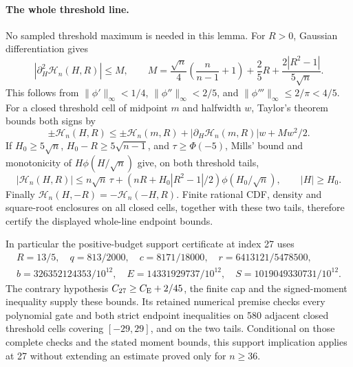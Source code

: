 \paragraph*{The whole threshold line.}
No sampled threshold maximum is needed in this lemma.
For \(R>0\), Gaussian differentiation gives
\[
 |\partial_H^2\mathcal H_n(H,R)|\le M,\qquad
 M=\frac{\sqrt n}{4}\left(\frac n{n-1}+1\right)
       +\frac25R+\frac{2|R^2-1|}{5\sqrt n}.
\]
This follows from \(\|\phi'\|_\infty<1/4\),
\(\|\phi''\|_\infty<2/5\), and
\(\|\phi'''\|_\infty\le2/\pi<4/5\).
For a closed threshold cell of midpoint \(m\) and halfwidth \(w\),
Taylor's theorem bounds both signs by
\[
 \pm\mathcal H_n(H,R)
 \le\pm\mathcal H_n(m,R)
       +|\partial_H\mathcal H_n(m,R)|w+Mw^2/2.
\]
If \(H_0\ge5\sqrt n\), \(H_0-R\ge5\sqrt{n-1}\), and
\(\tau\ge\Phi(-5)\), Mills' bound and monotonicity of
\(H\phi(H/\sqrt n)\) give, on both threshold tails,
\[
 |\mathcal H_n(H,R)|\le n\sqrt n\,\tau
 +(nR+H_0|R^2-1|/2)\phi(H_0/\sqrt n),\qquad |H|\ge H_0.
\]
Finally \(\mathcal H_n(H,-R)=-\mathcal H_n(-H,R)\).
Finite rational CDF, density and square-root enclosures on all
closed cells, together with these two tails, therefore certify
the displayed whole-line endpoint bounds.

In particular the positive-budget support certificate at index 27
uses
\[
 \begin{gathered}
 R=13/5,\quad q=813/2000,\quad c=8171/18000,\quad
 r=6413121/5478500,\\
 b=326352124353/10^{12},\quad E=14331929737/10^{12},\quad
 S=1019049330731/10^{12}.
 \end{gathered}
\]
The contrary hypothesis \(C_{27}\ge C_{\mathrm E}+2/45\), the finite
cap and the signed-moment inequality supply these bounds.
Its retained numerical premise checks every polynomial gate and both strict endpoint inequalities
on 580 adjacent closed threshold cells covering \([-29,29]\),
and on the two tails. Conditional on those complete checks and the stated moment bounds, this support
implication applies at 27 without extending an estimate proved only for \(n\ge36\).

